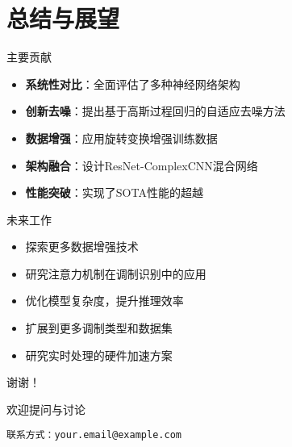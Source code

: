 \documentclass[aspectratio=169]{beamer}
\begin{document}
\section{总结与展望}

\begin{frame}{主要贡献}
\begin{itemize}
    \item \textbf{系统性对比}：全面评估了多种神经网络架构
    \item \textbf{创新去噪}：提出基于高斯过程回归的自适应去噪方法
    \item \textbf{数据增强}：应用旋转变换增强训练数据
    \item \textbf{架构融合}：设计ResNet-ComplexCNN混合网络
    \item \textbf{性能突破}：实现了SOTA性能的超越
\end{itemize}
\end{frame}

\begin{frame}{未来工作}
\begin{itemize}
    \item 探索更多数据增强技术
    \item 研究注意力机制在调制识别中的应用
    \item 优化模型复杂度，提升推理效率
    \item 扩展到更多调制类型和数据集
    \item 研究实时处理的硬件加速方案
\end{itemize}
\end{frame}

\begin{frame}
\begin{center}
{\Huge 谢谢！}

\vspace{2em}
{\Large 欢迎提问与讨论}

\vspace{2em}
\texttt{联系方式：your.email@example.com}
\end{center}
\end{frame}
\end{document}
